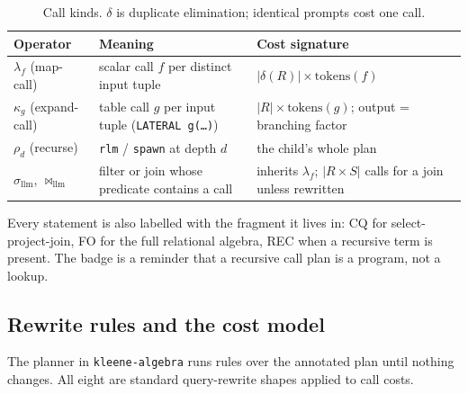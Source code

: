 \documentclass[11pt,a4paper]{article}
\newcommand{\code}[1]{\texttt{#1}}
\newcommand{\lmap}{\lambda_f}
\newcommand{\lexp}{\kappa_g}
\newcommand{\lrec}{\rho_d}
\begin{document}
\begin{table}[htbp]
\centering
\small
\begin{tabularx}{\textwidth}{@{}l Y l@{}}
\toprule
Operator & Meaning & Cost signature \\
\midrule
$\lmap$ (map-call) & scalar call $f$ per distinct input tuple & $|\delta(R)| \times \text{tokens}(f)$ \\
$\lexp$ (expand-call) & table call $g$ per input tuple (\code{LATERAL g(\ldots)}) & $|R| \times \text{tokens}(g)$; output = branching factor \\
$\lrec$ (recurse) & \code{rlm} / \code{spawn} at depth $d$ & the child's whole plan \\
$\sigma_{\text{llm}}$, $\bowtie_{\text{llm}}$ & filter or join whose predicate contains a call & inherits $\lmap$; $|R \times S|$ calls for a join unless rewritten \\
\bottomrule
\end{tabularx}
\caption{Call kinds. $\delta$ is duplicate elimination; identical prompts cost one call.}
\label{tab:callkinds}
\end{table}

Every statement is also labelled with the fragment it lives in: CQ for
select-project-join, FO for the full relational algebra, REC when a recursive
term is present. The badge is a reminder that a recursive call plan is a
program, not a lookup.

\subsection{Rewrite rules and the cost model}
\label{sec:planner}

The planner in \code{kleene-algebra} runs rules over the annotated plan until
nothing changes. All eight are standard query-rewrite shapes applied to call
costs.
\end{document}
